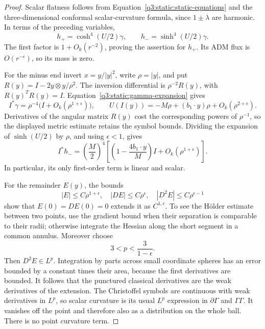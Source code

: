 \begin{proof}
Scalar flatness follows from
Equation~\eqref{q3:static:static-equations} and the three-dimensional
conformal scalar-curvature formula, since \(1\pm\lambda\) are harmonic.
In terms of the preceding variables,
\begin{equation}
\label{q3:static:conformal-gamma}
h_+=\cosh^4(U/2)\gamma,\qquad
h_-=\sinh^4(U/2)\gamma.
\end{equation}
The first factor is \(1+O_k(r^{-2})\), proving the assertion for
\(h_+\). Its ADM flux is \(O(r^{-\epsilon})\), so its mass is zero.

For the minus end invert \(x=y/|y|^2\), write \(\rho=|y|\), and
put \(R(y)=I-2y\otimes y/\rho^2\).
The inversion differential is \(\rho^{-2}R(y)\), with
\(R(y)^TR(y)=I\).
Equation~\eqref{q3:static:gamma-expansion} gives
\[
I^*\gamma=\rho^{-4}
\bigl(I+O_k(\rho^{1+\epsilon})\bigr),
\qquad
U(I(y))=-M\rho+(b_1\cdot y)\rho
 +O_k(\rho^{2+\epsilon}).
\]
Derivatives of the angular matrix \(R(y)\) cost the corresponding
powers of \(\rho^{-1}\), so the displayed metric estimate retains
the symbol bounds. Dividing the expansion of \(\sinh(U/2)\) by
\(\rho\), and using \(\epsilon<1\), gives
\begin{equation}
\label{q3:static:inverted-minus}
I^*h_-=\left(\frac M2\right)^4
\left[
\left(1-\frac{4b_1\cdot y}{M}\right)I
 +O_k(\rho^{1+\epsilon})
\right].
\end{equation}
In particular, its only first-order term is linear and scalar.

For the remainder \(E(y)\), the bounds
\[
|E|\leq C\rho^{1+\epsilon},\quad
|DE|\leq C\rho^\epsilon,\quad
|D^2E|\leq C\rho^{\epsilon-1}
\]
show that \(E(0)=DE(0)=0\) extends it as \(C^{1,\epsilon}\).
To see the Hölder estimate between two points, use the gradient
bound when their separation is comparable to their radii; otherwise
integrate the Hessian along the short segment in a common annulus.
Moreover choose
\[
3<p<\frac3{1-\epsilon}.
\]
Then \(D^2E\in L^p\). Integration by parts across small coordinate
spheres has an error bounded by a constant times their area,
because the first derivatives are bounded.
It follows that the punctured classical derivatives are the weak
derivatives of the extension.
The Christoffel symbols are continuous with weak derivatives in
\(L^p\), so scalar curvature is its usual \(L^p\) expression
in \(\partial\Gamma\) and \(\Gamma\Gamma\).
It vanishes off the point and therefore also as a distribution on
the whole ball. There is no point curvature term.
\end{proof}

